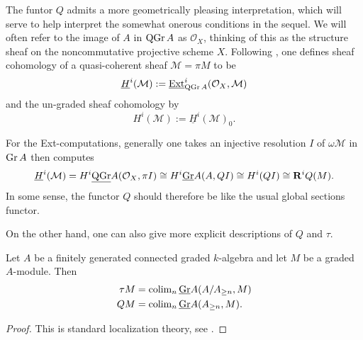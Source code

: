 The funtor \(Q\) admits a more geometrically pleasing interpretation, which will serve to help interpret the somewhat onerous conditions in the sequel.
We will often refer to the image of \(A\) in \(\operatorname{QGr}A\) as \(\mathcal{O}_X\), thinking of this as the structure sheaf on the noncommutative projective scheme \(X\).
Following \parencite{AZ94}, one defines sheaf cohomology of a quasi-coherent sheaf \(\mathcal{M} = \pi{M}\) to be
\[\underline{H}^i(\mathcal{M}) := \operatorname{\underline{Ext}}^i_{\operatorname{QGr}A}(\mathcal{O}_X, \mathcal{M})\]
and the un-graded sheaf cohomology by
\[H^i(\mathcal{M}) := \underline{H}^i(\mathcal{M})_0.\]

For the Ext-computations, generally one takes an injective resolution \(I\) of \(\omega\mathcal{M}\) in \(\operatorname{Gr}A\) then computes
\[\underline{H}^i(\mathcal{M}) = H^i\underline{\operatorname{QGr}}A(\mathcal{O}_X, \pi{I}) \cong H^i\underline{\operatorname{Gr}}A(A, QI) \cong H^i(QI) \cong \mathbf{R}^iQ(M).\]
In some sense, the functor \(Q\) should therefore be like the usual global sections functor.

On the other hand, one can also give more explicit descriptions of \(Q\) and \(\tau\). 

\begin{proposition}\label{prop: explicit Q and tau}
  Let \(A\) be a finitely generated connected graded \(k\)-algebra and let \(M\) be a graded \(A\)-module. Then 
  \begin{align*}
    \tau M & = \operatorname{colim}_n \underline{\operatorname{Gr}}A(A/A_{\geq n}, M) \\
    Q M & = \operatorname{colim}_n \underline{\operatorname{Gr}}A(A_{\geq n}, M).
  \end{align*}
\end{proposition}

\begin{proof}
  This is standard localization theory, see \parencite{Stenstrom75}.
\end{proof}
